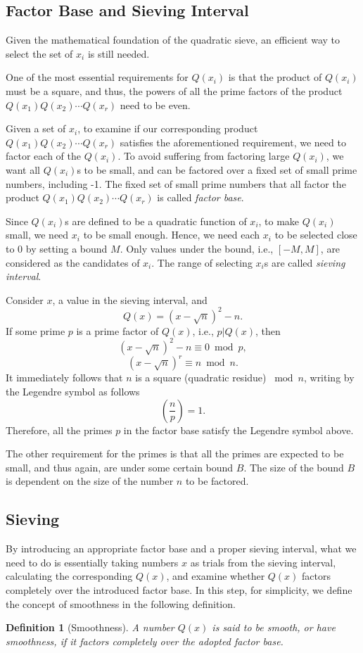 \documentclass[letterpaper, 10pt, conference]{ieeeconf}  %
\theoremstyle{definition}
\newtheorem{definition}{Definition}[section]
\theoremstyle{property}
\begin{document}
\subsection{Factor Base and Sieving Interval}
Given the mathematical foundation of the quadratic sieve, an efficient way to select the set of $x_i$ is still needed. 

One of the most essential requirements for $Q(x_i)$ is that the product of $Q(x_i)$ must be a square, and thus, the powers of all the prime factors of the product $Q(x_1)Q(x_2)\cdots Q(x_r)$ need to be even. 

Given a set of $x_i$, to examine if our corresponding product $Q(x_1)Q(x_2)\cdots Q(x_r)$ satisfies the aforementioned requirement, we need to factor each of the $Q(x_i)$. To avoid suffering from factoring large $Q(x_i)$, we want all $Q(x_i)$s to be small, and can be factored over a fixed set of small prime numbers, including -1. The fixed set of small prime numbers that all factor the product $Q(x_1)Q(x_2)\cdots Q(x_r)$ is called \textit{factor base}.

Since $Q(x_i)$s are defined to be a quadratic function of $x_i$, to make $Q(x_i)$ small, we need $x_i$ to be small enough. Hence, we need each $x_i$ to be selected close to 0 by setting a bound $M$. Only values under the bound, i.e., $[-M,M]$, are considered as the candidates of $x_i$. The range of selecting $x_i$s are called \textit{sieving interval}.

Consider $x$, a value in the sieving interval, and
$$Q(x) = (x-\sqrt{n})^2-n.$$
If some prime $p$ is a prime factor of $Q(x)$, i.e., $p|Q(x)$, then 
$$(x-\sqrt{n})^2-n\equiv 0\bmod p,$$
$$(x-\sqrt{n})^r\equiv n\bmod n.$$
It immediately follows that $n$ is a square (quadratic residue) $\bmod n$, writing by the Legendre symbol as follows
$$\left(\frac{n}{p}\right) = 1.$$
Therefore, all the primes $p$ in the factor base satisfy the Legendre symbol above.

The other requirement for the primes is that all the primes are expected to be small, and thus again, are under some certain bound $B$. The size of the bound $B$ is dependent on the size of the number $n$ to be factored. 

\subsection{Sieving}
By introducing an appropriate factor base and a proper sieving interval, what we need to do is essentially taking numbers $x$ as trials from the sieving interval, calculating the corresponding $Q(x)$, and examine whether $Q(x)$ factors completely over the introduced factor base. In this step, for simplicity, we define the concept of smoothness in the following definition.
\begin{definition}[Smoothness]
    \textit{A number $Q(x)$ is said to be smooth, or have smoothness, if it factors completely over the adopted factor base.}
\end{definition}
\end{document}
